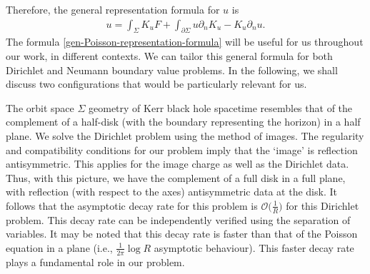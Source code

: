 \documentclass[pdftex]{sigma}
\def\ptl{\partial}%
\numberwithin{equation}{section}
\begin{document}
Therefore, the general representation formula for $u$ is
\begin{align} \label{gen-Poisson-representation-formula}
u = \int_{\Sigma} K_u F + \int_{\ptl \Sigma} u \ptl_n K_{u} - K_{u} \ptl_n u.
\end{align}
The formula \eqref{gen-Poisson-representation-formula} will be useful for us throughout our work, in different contexts. We can tailor this general formula for both Dirichlet and Neumann boundary value problems. In the following, we shall discuss two configurations that would be particularly relevant for us.

The orbit space $\Sigma$ geometry of Kerr black hole spacetime resembles that of the complement of a half-disk (with the boundary representing the horizon) in a half plane. We solve the Dirichlet problem using the method of images. The regularity and compatibility conditions for our problem imply that the `image' is reflection antisymmetric. This applies for the image charge as well as the Dirichlet data. Thus, with this picture, we have the complement of a full disk in a full plane, with reflection (with respect to the axes) antisymmetric data at the disk. It follows that the asymptotic decay rate for this problem is $\mathcal{O} \bigl(\frac{1}{R}\bigr)$ for this Dirichlet problem. This decay rate can be independently verified using the separation of variables. It may be noted that this decay rate is faster than that of the Poisson equation in a plane \big(i.e., $\frac{1}{2 \pi} \log R$ asymptotic behaviour\big). This faster decay rate plays a fundamental role in our problem.
\end{document}
